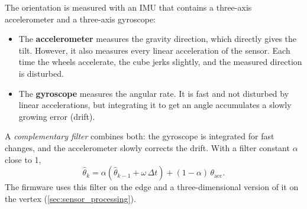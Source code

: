 The orientation is measured with an IMU that contains a three-axis accelerometer and a three-axis
gyroscope:
\begin{itemize}
  \item The \textbf{accelerometer} measures the gravity direction, which directly gives the tilt.
        However, it also measures every linear acceleration of the sensor. Each time the wheels
        accelerate, the cube jerks slightly, and the measured direction is disturbed.
  \item The \textbf{gyroscope} measures the angular rate. It is fast and not disturbed by linear
        accelerations, but integrating it to get an angle accumulates a slowly growing error
        (drift).
\end{itemize}
A \emph{complementary filter} combines both: the gyroscope is integrated for fast changes, and the
accelerometer slowly corrects the drift. With a filter constant $\alpha$ close to 1,
\begin{equation}
  \hat\theta_k = \alpha\left(\hat\theta_{k-1} + \omega\,\Delta t\right) + (1-\alpha)\,\theta_\text{acc} .
  \label{eq:cf}
\end{equation}
The firmware uses this filter on the edge and a three-dimensional version of it on the vertex
(\cref{sec:sensor_processing}).
